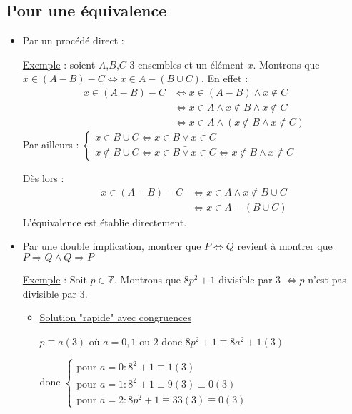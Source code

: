 \documentclass[12pt,a4paper,french]{book}
\begin{document}
\subsection{Pour une équivalence}
\begin{itemize}
	\item Par un procédé direct :
	
	\underline{Exemple} : soient $A$,$B$,$C$ 3 ensembles et un élément $x$. Montrons que $x \in (A-B)-C \Leftrightarrow x \in A-(B \cup C)$.
	En effet : \begin{equation}
		\begin{split}
			x \in (A-B)-C & \Leftrightarrow x \in (A-B) \wedge x \notin C \\ &\Leftrightarrow x \in A \wedge x \notin B \wedge x \notin C \\ &\Leftrightarrow x \in A \wedge (x \notin B \wedge x \notin C) \end{split}
	\end{equation}
	Par ailleurs : $
	\left\{ 
	\begin{array}{ll}
		x \in B \cup C \Leftrightarrow x \in B \vee x \in C \\ 
		x \notin B \cup C \Leftrightarrow \bar{x \in B \vee x \in C} \Leftrightarrow x \notin B \wedge x \notin C
	\end{array}
	\right. $ 
	
	Dès lors : \begin{equation} 
		\begin{split} x \in (A-B)-C & \Leftrightarrow x \in A \wedge x \notin B \cup C \\ & \Leftrightarrow x \in A - (B\cup C) \end{split}
		\end{equation}
	L'équivalence est établie directement.
	\item Par une double implication, montrer que $P \Leftrightarrow Q$ revient à montrer que $P \Rightarrow Q \wedge Q \Rightarrow P$
	
	\underline{Exemple} : Soit $p \in \mathbb{Z}$. Montrons que $8p^{2}+1$ divisible par 3 $\Leftrightarrow p$ n'est pas divisible par 3.
	\begin{itemize}
		\item \underline{Solution "rapide" avec congruences}
		
		$p \equiv a (3)$ où $a = 0,1$ ou $2$ donc $8p^{2}+1 \equiv 8a^{2}+1 (3)$
		
		donc $\left\{ 
		\begin{array}{ll}
			\mbox{pour }a = 0 : 8^{2}+1 \equiv 1 (3) \\ 
			\mbox{pour }a = 1 : 8^{2}+1 \equiv 9 (3) \equiv 0 (3) \\
			\mbox{pour }a = 2 : 8p^{2} +1 \equiv 33 (3) \equiv 0 (3)
		\end{array}
		\right. $
		

\end{itemize}
\end{itemize}
\end{document}
